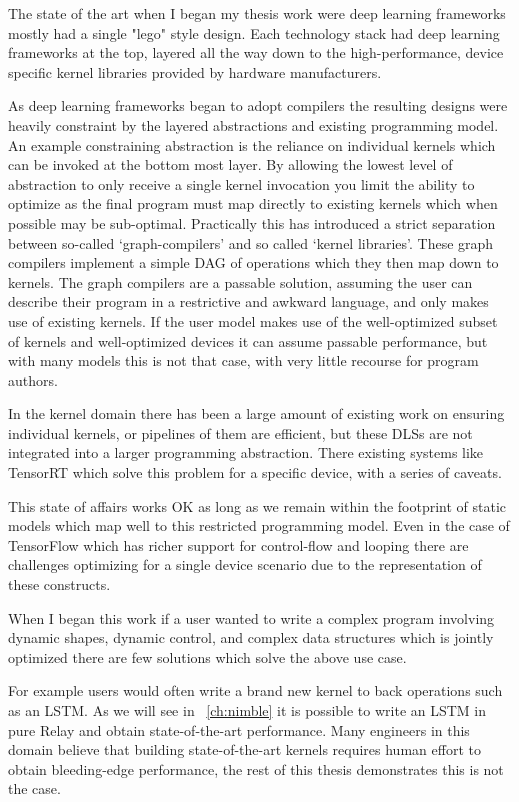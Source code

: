 The state of the art when I began my thesis work were
  deep learning frameworks mostly had a single "lego" style design.
Each technology stack had deep learning frameworks at the top,
  layered all the way down to the high-performance,
  device specific kernel libraries provided by hardware manufacturers.

As deep learning frameworks began to adopt compilers
  the resulting designs were heavily constraint by the layered abstractions
  and existing programming model.
An example constraining abstraction is the reliance on individual
  kernels which can be invoked at the bottom most layer.
By allowing the lowest level of abstraction to only receive a single
  kernel invocation you limit the ability to optimize as the final
  program must map directly to existing kernels which when possible
  may be sub-optimal.
Practically this has introduced a strict separation between so-called
  ‘graph-compilers’ and so called ‘kernel libraries’.
These graph compilers implement a simple DAG of operations
  which they then map down to kernels.
The graph compilers are a passable solution, assuming the user can describe their program
  in a restrictive and awkward language, and only makes use of existing kernels.
If the user model makes use of the well-optimized subset of kernels and well-optimized devices
  it can assume passable performance, but with many models this is not that case, with very little recourse for program authors.

In the kernel domain there has been a large amount of existing work on
  ensuring individual kernels, or pipelines of them are efficient,
  but these DLSs are not integrated into a larger programming abstraction.
There existing systems like TensorRT which solve this problem for a specific device,
  with a series of caveats.

This state of affairs works OK as long as we remain within the footprint of static
  models which map well to this restricted programming model.
Even in the case of TensorFlow which has richer support for control-flow and
  looping there are challenges optimizing for a single device scenario due
  to the representation of these constructs.

When I began this work if a user wanted to write a complex program involving dynamic shapes,
  dynamic control, and complex data structures which is jointly optimized there are few
  solutions which solve the above use case.

For example users would often write a brand new kernel to back operations such
  as an LSTM.
As we will see in ~\ref{ch:nimble} it is possible to write an LSTM in pure Relay
  and obtain state-of-the-art performance.
Many engineers in this domain believe that building state-of-the-art kernels requires
  human effort to obtain bleeding-edge performance, the rest of this thesis demonstrates
  this is not the case.

